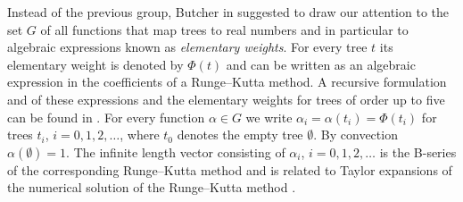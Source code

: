 Instead of the previous group, Butcher in \cite{Butcher1972} suggested to draw our attention to the set $G$ of all functions that map trees to real numbers and in particular to algebraic expressions known as \emph{elementary weights}. For every tree $t$ its elementary weight is denoted by $\Phi(t)$ and  can be written as an algebraic expression in the coefficients of a Runge--Kutta method.  A recursive formulation and of these expressions and the elementary weights for trees of order up to five can be found in \cite[Definition and Tables~3.12]{Butcher2008_book}.  For every function $\alpha \in G$ we write $\alpha_{i} = \alpha(t_{i}) = \Phi(t_{i})$ for trees $t_{i}$, $i = 0, 1, 2, \dots$, where $t_{0}$ denotes the empty tree $\emptyset$. By convection $\alpha(\emptyset) = 1$. The infinite length vector consisting of $\alpha_i$, $i = 0, 1, 2, \ldots$ is the B-series of the corresponding Runge--Kutta method and is related to Taylor expansions of the numerical solution of the Runge--Kutta method \cite{Hairer1974, Butcher2008_book}.

